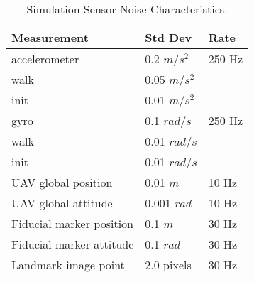 \begin{table}[h!]
  \begin{center}
    \caption{Simulation Sensor Noise Characteristics.}
    \label{tab:sim_noise}
    \begin{tabular}{l|l|l}
      \textbf{Measurement} & \textbf{Std Dev} & \textbf{Rate} \\
      \hline
      accelerometer & 0.2 $m/s^2$ & 250 Hz \\
      walk & 0.05 $m/s^2$  \\
      init & 0.01 $m/s^2$ \\
      gyro & 0.1 $rad/s$ & 250 Hz \\
      walk & 0.01 $rad/s$  \\
      init & 0.01 $rad/s$ \\
      UAV global position & 0.01 $m$ & 10 Hz \\
      UAV global attitude & 0.001 $rad$ & 10 Hz \\
      Fiducial marker position & 0.1 $m$ & 30 Hz \\
      Fiducial marker attitude & 0.1 $rad$ & 30 Hz \\
      Landmark image point & 2.0 pixels & 30 Hz \\
    \end{tabular}
  \end{center}
\end{table}
